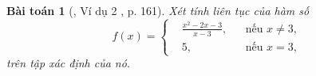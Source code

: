 \documentclass{article}
\newtheorem{baitoan}{Bài toán}
\begin{document}
\begin{baitoan}[\cite{SBT_Toan_11_dai_so_giai_tich_co_ban}, Ví dụ 2 , p. 161]
	Xét tính liên tục của hàm số
	\begin{equation*}
		f(x) = \left\{\begin{split}
			&\frac{x^2 - 2x - 3}{x - 3},&&\mbox{nếu }x\ne3,\\
			&5,&&\mbox{nếu }x = 3,
		\end{split}\right.
	\end{equation*} 
	trên tập xác định của nó.
\end{baitoan}


\printbibliography[heading=bibintoc]
	
\end{document}
